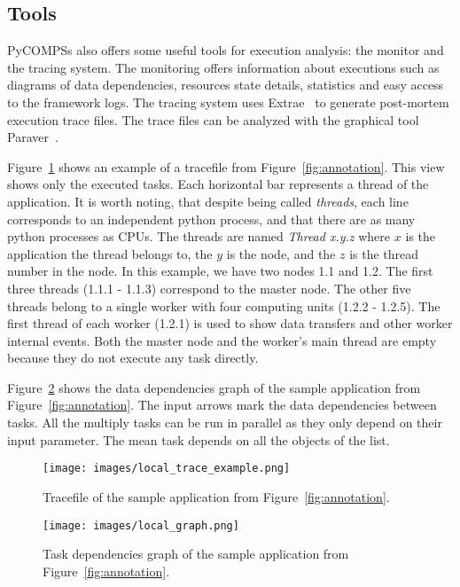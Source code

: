 \subsection{Tools}

PyCOMPSs also offers some useful tools for execution analysis: the monitor and the tracing system. The monitoring offers information about executions such as diagrams of data dependencies, resources state details, statistics and easy access to the framework logs. The tracing system uses Extrae~\cite{extrae} to  generate post-mortem execution trace files. The trace files can be analyzed with the graphical tool Paraver~\cite{paraver}.

Figure~\ref{fig:trace_example} shows an example of a tracefile from Figure~\ref{fig:annotation}. This view shows only the executed tasks. Each horizontal bar represents a thread of the application. It is worth noting, that despite being called \textit{threads}, each line corresponds to an independent python process, and that there are as many python processes as CPUs. The threads are named \textit{Thread x.y.z} where $x$ is the application the thread belongs to, the $y$ is the node, and the $z$ is the thread number in the node. In this example, we have two nodes 1.1 and 1.2. The first three threads (1.1.1 - 1.1.3) correspond to the master node. The other five threads belong to a single worker with four computing units (1.2.2 - 1.2.5). The first thread of each worker (1.2.1) is used to show data transfers and other worker internal events. Both the master node and the worker's main thread are empty because they do not execute any task directly.

Figure~\ref{fig:graph_example} shows the data dependencies graph of the sample application from Figure~\ref{fig:annotation}. The input arrows mark the data dependencies between tasks. All the multiply tasks can be run in parallel as they only depend on their input parameter. The mean task depends on all the objects of the list.

\begin{figure}
    \centering
    \texttt{[image: images/local\_trace\_example.png]}
    \caption{\small Tracefile of the sample application from Figure~\ref{fig:annotation}.}
    \label{fig:trace_example}
\end{figure}

\begin{figure}
    \centering
    \texttt{[image: images/local\_graph.png]}
    \caption{\small Task dependencies graph of the sample application from Figure~\ref{fig:annotation}.}
    \label{fig:graph_example}
\end{figure}


